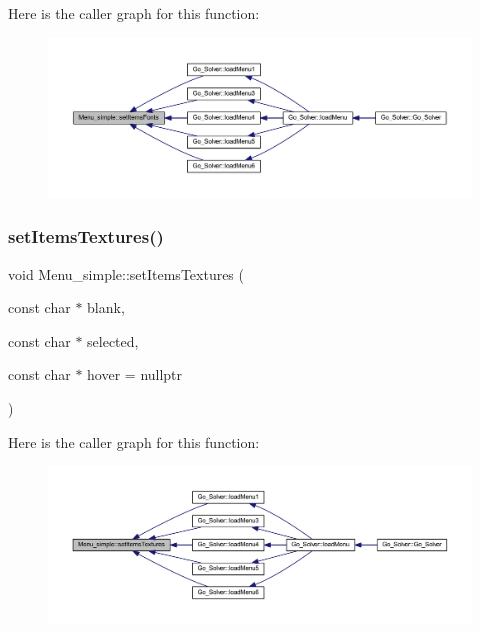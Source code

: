 Here is the caller graph for this function\+:
\nopagebreak
\begin{figure}[H]
\begin{center}
\leavevmode
\includegraphics[width=350pt]{class_menu__simple_a1273e6743ee892cd8651968efd595b73_icgraph}
\end{center}
\end{figure}
\mbox{\label{class_menu__simple_a4717470decb5666cbac7aa879aade5fa}} 
\subsubsection{\texorpdfstring{set\+Items\+Textures()}{setItemsTextures()}}
{\footnotesize\ttfamily void Menu\+\_\+simple\+::set\+Items\+Textures (\begin{DoxyParamCaption}\item[{const char $\ast$}]{blank,  }\item[{const char $\ast$}]{selected,  }\item[{const char $\ast$}]{hover = {\ttfamily nullptr} }\end{DoxyParamCaption})\hspace{0.3cm}{\ttfamily [virtual]}}

Here is the caller graph for this function\+:
\nopagebreak
\begin{figure}[H]
\begin{center}
\leavevmode
\includegraphics[width=350pt]{class_menu__simple_a4717470decb5666cbac7aa879aade5fa_icgraph}
\end{center}
\end{figure}


